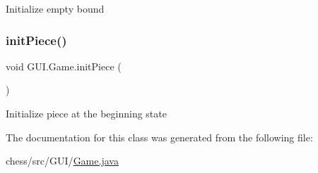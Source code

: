 Initialize empty bound \mbox{\label{class_g_u_i_1_1_game_aef9ef14fe6c177e97b41280180c7ae2d}} 
\subsubsection{\texorpdfstring{initPiece()}{initPiece()}}
{\footnotesize\ttfamily void G\+U\+I.\+Game.\+init\+Piece (\begin{DoxyParamCaption}{ }\end{DoxyParamCaption})\hspace{0.3cm}{\ttfamily [inline]}}

Initialize piece at the beginning state 

The documentation for this class was generated from the following file\+:\begin{DoxyCompactItemize}
\item 
chess/src/\+G\+U\+I/\mbox{\hyperlink{_game_8java}{Game.\+java}}\end{DoxyCompactItemize}
